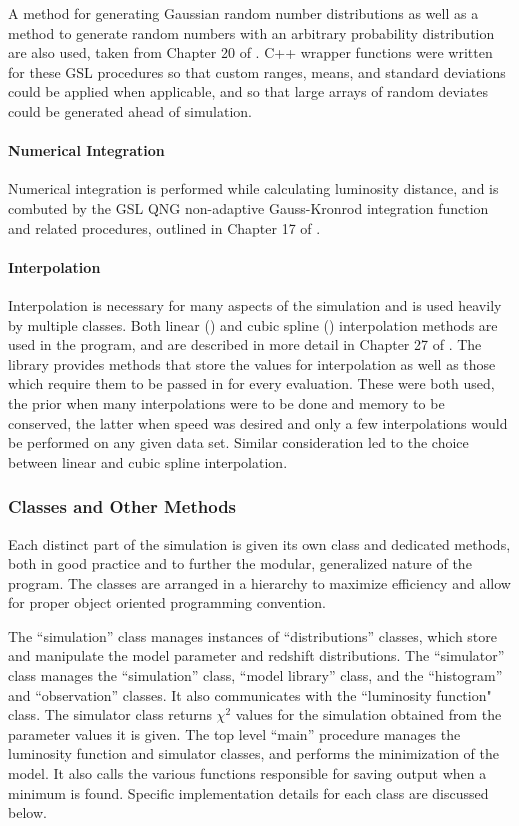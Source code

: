 \documentclass[twocolumn,letterpaper,10pt]{article}
\begin{document}
A method for generating Gaussian random number distributions as well as a method to generate random numbers with an arbitrary probability distribution are also used, taken from Chapter 20 of \citet{GSL}.  C++ wrapper functions were written for these GSL procedures so that custom ranges, means, and standard deviations could be applied when applicable, and so that large arrays of random deviates could be generated ahead of simulation.

\paragraph{Numerical Integration}

Numerical integration is performed while calculating luminosity distance, and is combuted by the GSL QNG non-adaptive Gauss-Kronrod integration function and related procedures, outlined in Chapter 17 of \citet{GSL}.

\paragraph{Interpolation}

Interpolation is necessary for many aspects of the simulation and is used heavily by multiple classes. Both linear ({}) and cubic spline ({}) interpolation methods are used in the program, and are described in more detail in Chapter 27 of \citet{GSL}. The library provides methods that store the values for interpolation as well as those which require them to be passed in for every evaluation. These were both used, the prior when many interpolations were to be done and memory to be conserved, the latter when speed was desired and only a few interpolations would be performed on any given data set. Similar consideration led to the choice between linear and cubic spline interpolation.

\subsubsection{Classes and Other Methods}
Each distinct part of the simulation is given its own class and dedicated methods, both in good practice and to further the modular, generalized nature of the program. The classes are arranged in a hierarchy to maximize efficiency and allow for proper object oriented programming convention. 

The ``simulation'' class manages instances of ``distributions'' classes, which store and manipulate the model parameter and redshift distributions. The ``simulator'' class manages the ``simulation'' class, ``model library'' class, and the ``histogram'' and ``observation'' classes. It also communicates with the ``luminosity function" class. The simulator class returns $\chi^2$ values for the simulation obtained from the parameter values it is given. The top level ``main'' procedure manages the luminosity function and simulator classes, and performs the minimization of the model. It also calls the various functions responsible for saving output when a minimum is found. Specific implementation details for each class are discussed below.
\end{document}
